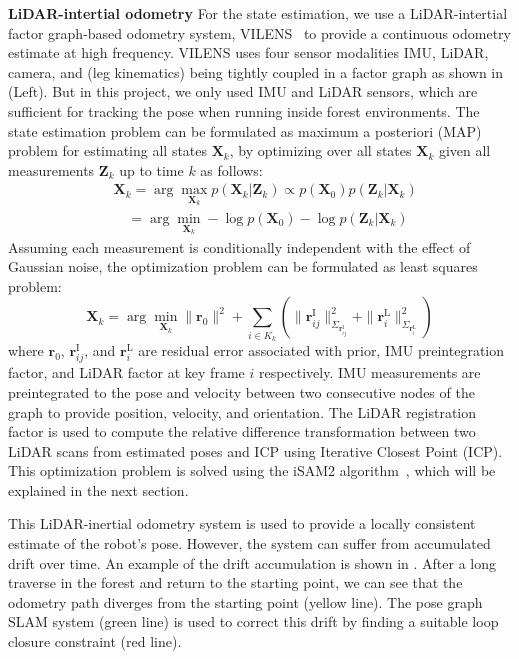 \noindent \textbf{LiDAR-intertial odometry} \hspace{0.5em} For the state estimation, we use a LiDAR-intertial factor graph-based odometry system, VILENS~\cite{wisth2023tro} to provide a continuous odometry estimate at high frequency. VILENS uses four sensor modalities IMU, LiDAR, camera, and (leg kinematics) being tightly coupled in a factor graph as shown in  (Left). But in this project, we only used IMU and LiDAR sensors, which are sufficient for tracking the pose when running inside forest environments. 
The state estimation problem can be formulated as maximum a posteriori (MAP) problem for estimating all states $\mathbf{X}_k$, by optimizing over all states $\mathbf{X}_k$ given all measurements $\mathbf{Z}_k$ up to time $k$ as follows: 
\begin{equation}
  \begin{aligned}
  &\mathbf{X}_k = \arg\max_{\mathbf{X}_k} p(\mathbf{X}_k|\mathbf{Z}_k) \propto p(\mathbf{X}_0) p(\mathbf{Z}_k|\mathbf{X}_k) \\
  &\quad= \arg\min_{\mathbf{X}_k} -\log p(\mathbf{X}_0) -\log p(\mathbf{Z}_k|\mathbf{X}_k)
  \end{aligned}
\end{equation}
Assuming each measurement is conditionally independent with the effect of Gaussian noise, the optimization problem can be formulated as least squares problem:   
\begin{equation}
  \mathbf{X}_k = \arg\min_{\mathbf{X}_k} \| \mathbf{r}_0 \|^2 + \sum_{i \in K_k} \left( \| \mathbf{r}^{\text{I}}_{ij} \|_{\Sigma_{\mathbf{r}^{\text{I}}_{ij}}}^2 + \| \mathbf{r}^{\text{L}}_{i} \|_{\Sigma_{\mathbf{r}^{\text{L}}_{i}}}^2  \right)
\end{equation}\label{eq:least_square}
where $\mathbf{r}_0$, $\mathbf{r}^{\text{I}}_{ij}$, and $\mathbf{r}^{\text{L}}_{i}$ are residual error associated with prior, IMU preintegration factor, and LiDAR factor at key frame $i$ respectively. IMU measurements are preintegrated to the pose and velocity between two consecutive nodes of the graph to provide position, velocity, and orientation. The LiDAR registration factor is used to compute the relative difference transformation between two LiDAR scans from estimated poses and ICP using Iterative Closest Point (ICP). This optimization problem is solved using the iSAM2 algorithm~\cite{Kaess2012}, which will be explained in the next section. 

This LiDAR-inertial odometry system is used to provide a locally consistent estimate of the robot's pose. However, the system can suffer from accumulated drift over time. An example of the drift accumulation is shown in . After a long traverse in the forest and return to the starting point, we can see that the odometry path diverges from the starting point (yellow line). The pose graph SLAM system (green line) is used to correct this drift by finding a suitable loop closure constraint (red line). \vspace{6pt}


